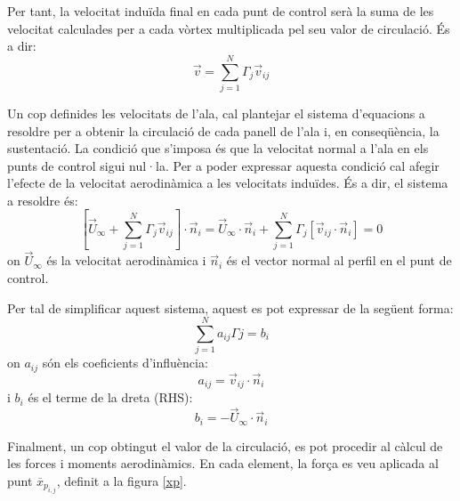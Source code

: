 Per tant, la velocitat induïda final en cada punt de control serà la suma de les velocitat calculades per a cada vòrtex multiplicada pel seu valor de circulació. És a dir:
\begin{equation}
\vec{v}=\sum_{j=1}^{N}\Gamma_{j}\vec{v}_{ij}
\end{equation}

Un cop definides les velocitats de l'ala, cal plantejar el sistema d'equacions a resoldre per a obtenir la circulació de cada panell de l'ala i, en conseqüència, la sustentació. La condició que s'imposa és que la velocitat normal a l'ala en els punts de control sigui nul·la. Per a poder expressar aquesta condició cal afegir l'efecte de la velocitat aerodinàmica a les velocitats induïdes. És a dir, el sistema a resoldre és:
\begin{equation}
\left[\vec{U}_{\infty}+\sum_{j=1}^{N}\Gamma_{j}\vec{v}_{ij}\right]\cdot\vec{n}_{i}=\vec{U}_{\infty}\cdot\vec{n}_{i}+\sum_{j=1}^{N}\Gamma_{j}\left[\vec{v}_{ij}\cdot\vec{n}_{i}\right]=0
\end{equation}
on $\vec{U}_{\infty}$ és la velocitat aerodinàmica i $\vec{n}_{i}$ és el vector normal al perfil en el punt de control.

Per tal de simplificar aquest sistema, aquest es pot expressar de la següent forma:
\begin{equation}
\sum_{j=1}^{N}a_{ij}\Gamma{j}=b_{i}
\end{equation}
on $a_{ij}$ són els coeficients d'influència:
\begin{equation}
a_{ij}=\vec{v}_{ij}\cdot\vec{n}_{i}
\end{equation}
i $b_{i}$ és el terme de la dreta (RHS):
\begin{equation}
b_{i}=-\vec{U}_{\infty}\cdot\vec{n}_{i}
\end{equation}

Finalment, un cop obtingut el valor de la circulació, es pot procedir al càlcul de les forces i moments aerodinàmics. En cada element, la força es veu aplicada al punt $\overline{x}_{p_{i,j}}$, definit a la figura \ref{xp}.

